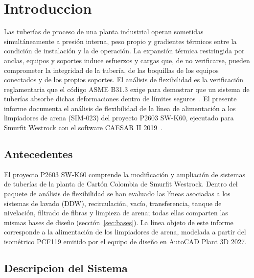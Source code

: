 \section{Introduccion}
\label{sec:intro}

Las tuber\'{i}as de proceso de una planta industrial operan sometidas
simult\'{a}neamente a presi\'{o}n interna, peso propio y gradientes t\'{e}rmicos
entre la condici\'{o}n de instalaci\'{o}n y la de operaci\'{o}n. La expansi\'{o}n
t\'{e}rmica restringida por anclas, equipos y soportes induce esfuerzos y cargas
que, de no verificarse, pueden comprometer la integridad de la tuber\'{i}a, de las
boquillas de los equipos conectados y de los propios soportes. El an\'{a}lisis de
flexibilidad es la verificaci\'{o}n reglamentaria que el c\'{o}digo ASME B31.3
exige para demostrar que un sistema de tuber\'{i}as absorbe dichas deformaciones
dentro de l\'{i}mites seguros~\cite{asme_b313_2016}. El presente informe documenta
el an\'{a}lisis de flexibilidad de la l\'{i}nea de alimentaci\'{o}n a los
limpiadores de arena (SIM-023) del proyecto P2603 SW-K60,
ejecutado para Smurfit Westrock con el software CAESAR II
2019~\cite{caesar2_ug_2019}.

\subsection{Antecedentes}

El proyecto P2603 SW-K60 comprende la modificaci\'{o}n y ampliaci\'{o}n de
sistemas de tuber\'{i}as de la planta de Cart\'{o}n Colombia de Smurfit Westrock.
Dentro del paquete de an\'{a}lisis de flexibilidad se han evaluado las
l\'{i}neas asociadas a los sistemas de lavado (DDW), recirculaci\'{o}n, vac\'{i}o,
transferencia, tanque de nivelaci\'{o}n, filtrado de fibras y limpieza de arena;
todas ellas comparten las mismas bases de dise\~{n}o
(secci\'{o}n~\ref{sec:bases}). La l\'{i}nea objeto de este informe corresponde a
la alimentaci\'{o}n de los limpiadores de arena, modelada a partir
del isom\'{e}trico PCF119 emitido por el equipo de dise\~{n}o en AutoCAD Plant
3D 2027.

\subsection{Descripcion del Sistema}

